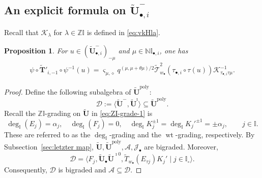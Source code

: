 \documentclass[a4paper,reqno,12pt]{amsart}
\numberwithin{equation}{section}
\newtheorem{proposition}{Proposition}[section]
\theoremstyle{definition}
\theoremstyle{plain}
\theoremstyle{definition}
\def\N{\mathbb N}
\def\Z{\mathbb Z}
\def\I{\mathbb I}
\def\wI{\I_\circ}
\def\bIi{\I_{\bullet,i}}
\def\bw{w_\bullet}
\def\tU{\widetilde{\mathbf U}}
\def\tUi{\widetilde{\mathbf U}^{\imath}}
\def \tbU{\tU_{\bullet}}
\def \tbiU{\tU_{\bullet,i}}
\def\tTD{\widetilde T}
\def\tT{\widetilde{\mathscr T}}
\def\tTT{\widetilde{\mathbf T}}
\def\cA{\mathcal A}
\def\cJ{\mathcal J}
\def\cK{\mathcal K}
\def\cD{\mathcal D}
\def\vs{\varsigma}
\def\dm{\diamond}
\newcommand{\tTa}[1]{\tTT'_{#1,-1}}
\newcommand{\poly}{\mathrm{poly}}
\newcommand{\wt}{\operatorname{wt}}
\newcommand{\redtext}[1]{\textcolor{red}{#1}}
\newcommand{\red}[1]{\redtext{ #1}}
\begin{document}


\subsection{An explicit formula on $\tbiU^-$}
Recall that $\mathcal{K}_\lambda$ for $\lambda\in\Z\I$ is defined in \eqref{eq:vkHla}.
\begin{proposition}\label{prop:local formula for U-}
For $u\in(\tbiU^-)_{-\mu}$ and $\mu\in\N\bIi$, one has
    \begin{align}
        \psi\circ\tTa{i}\circ\psi^{-1}(u)=\vs_{\mu,\dm}q^{(\mu,\mu+\theta\mu)/2}\tT_{\bw}^2(\tau_{\bullet,i}\circ\tau(u))\cK_{\tau_{\bullet,i}\tau \mu}^{-1}.
    \end{align}
\end{proposition}
\iffalse
\begin{proof}
 Define the following subalgebra of $\tU^\poly$:
 \begin{equation}
    \cD:=\langle\tU^-,\tUi\rangle\subseteq\tU^\poly.\label{eq:subalg-D}
 \end{equation}
 Recall the $\Z\I$-grading on $\tU$ in \eqref{eq:ZI-grade-1} is 
 \begin{equation*}
     \deg_\I(E_j)=\alpha_j,\quad\deg_\I(F_j)=0,\quad\deg_\I K_j^{\pm1}=\deg_\I K_j'^{\pm1}=\pm\alpha_j,\qquad j\in\I.
 \end{equation*}
 These are referred to as the $\deg_\I$-grading and the $\wt$-grading, respectively. By Subsection~\ref{sec:letzter map}, $\tU,\tU^\poly,\cA,\cJ_\bullet$ are bigraded. Moreover,
 \begin{equation}\label{eq:generators of D}
     \cD=\langle F_j,\tbU\tU^{\imath0},\tTD_{\bw}(E_{\tau j})K_j'\mid j\in\wI\rangle.
 \end{equation}
 Consequently, $\cD$ is bigraded and $\cA\subseteq\cD$. 


\end{proof}
\end{document}
